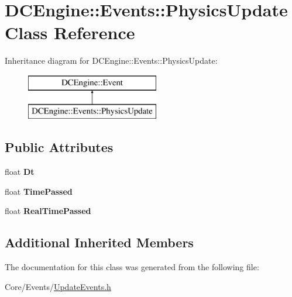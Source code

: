 \hypertarget{classDCEngine_1_1Events_1_1PhysicsUpdate}{\section{D\-C\-Engine\-:\-:Events\-:\-:Physics\-Update Class Reference}
\label{classDCEngine_1_1Events_1_1PhysicsUpdate}
}
Inheritance diagram for D\-C\-Engine\-:\-:Events\-:\-:Physics\-Update\-:\begin{figure}[H]
\begin{center}
\leavevmode
\includegraphics[height=2.000000cm]{classDCEngine_1_1Events_1_1PhysicsUpdate}
\end{center}
\end{figure}
\subsection*{Public Attributes}
\begin{DoxyCompactItemize}
\item 
\hypertarget{classDCEngine_1_1Events_1_1PhysicsUpdate_aa97583b07855cdeaf549603793b7318b}{float {\bfseries Dt}}\label{classDCEngine_1_1Events_1_1PhysicsUpdate_aa97583b07855cdeaf549603793b7318b}

\item 
\hypertarget{classDCEngine_1_1Events_1_1PhysicsUpdate_abcfaad5066d05a61b53a252407bed302}{float {\bfseries Time\-Passed}}\label{classDCEngine_1_1Events_1_1PhysicsUpdate_abcfaad5066d05a61b53a252407bed302}

\item 
\hypertarget{classDCEngine_1_1Events_1_1PhysicsUpdate_a9c2f084a3eaeb66f2cec7c71735fa6b5}{float {\bfseries Real\-Time\-Passed}}\label{classDCEngine_1_1Events_1_1PhysicsUpdate_a9c2f084a3eaeb66f2cec7c71735fa6b5}

\end{DoxyCompactItemize}
\subsection*{Additional Inherited Members}


The documentation for this class was generated from the following file\-:\begin{DoxyCompactItemize}
\item 
Core/\-Events/\hyperlink{UpdateEvents_8h}{Update\-Events.\-h}\end{DoxyCompactItemize}
